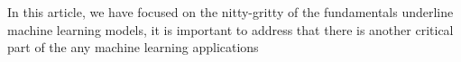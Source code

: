 In this article, we have focused on the nitty-gritty of the fundamentals underline machine learning models, it is important to address that there is another critical part of the any machine learning applications